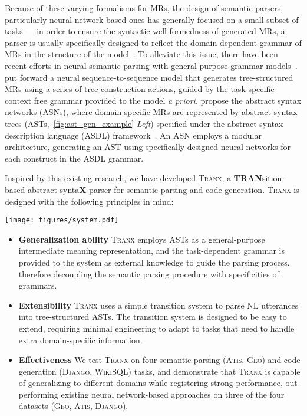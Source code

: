\documentclass[11pt,a4paper]{article}
\def\model/{\textsc{Tranx}}
\def\atis/{\textsc{Atis}}
\def\django/{\textsc{Django}}
\def\wikisql/{\textsc{WikiSQL}}
\def\geo/{\textsc{Geo}}
\begin{document}
Because of these varying formalisms for MRs, the design of semantic parsers, particularly neural network-based ones has generally focused on a small subset of tasks --- in order to ensure the syntactic well-formedness of generated MRs, a parser is usually specifically designed to reflect the domain-dependent grammar of MRs in the structure of the model~\citep{DBLP:journals/corr/abs-1709-00103,xu2017sqlnet}.
To alleviate this issue, there have been recent efforts in neural semantic parsing with general-purpose grammar models~\citep{DBLP:conf/acl/XiaoDG16,dong18coarsefine}.
\citet{yin17acl} put forward a neural sequence-to-sequence model that generates tree-structured MRs using a series of tree-construction actions, guided by the task-specific context free grammar provided to the model \textit{a priori}.
\citet{rabinovich17syntaxnet} propose the abstract syntax networks (ASNs), where domain-specific MRs are represented by abstract syntax trees (ASTs,~\autoref{fig:ast_gen_example} {\it Left}) specified under the abstract syntax description language (ASDL) framework~\citep{wang97asdl}.
An ASN employs a modular architecture, generating an AST using specifically designed neural networks for each construct in the ASDL grammar.

Inspired by this existing research, we have developed \model/, a \textbf{TRAN}sition-based abstract synta\textbf{X} parser for semantic parsing and code generation.
\model/ is designed with the following principles in mind:

\begin{figure*}[ht]
  \centering
  \texttt{[image: figures/system.pdf]}
  \caption{Workflow of \model/}
  \label{fig:system}
\end{figure*}

\begin{itemize}[leftmargin=*]
\setlength\itemsep{0.2em}
  \item \textbf{Generalization ability} \model/ employs ASTs as a general-purpose intermediate meaning representation, and the task-dependent grammar is provided to the system as external knowledge to guide the parsing process, therefore decoupling the semantic parsing procedure with specificities of grammars.
  \item \textbf{Extensibility} \model/ uses a simple transition system to parse NL utterances into tree-structured ASTs. The transition system is designed to be easy to extend, requiring minimal engineering to adapt to tasks that need to handle extra domain-specific information.
  \item \textbf{Effectiveness} We test \model/ on four semantic parsing (\atis/, \geo/) and code generation (\django/, \wikisql/) tasks, and demonstrate that \model/ is capable of generalizing to different domains while registering strong performance, out-performing existing neural network-based approaches on three of the four datasets (\geo/, \atis/, \django/).
\end{itemize} 
\end{document}

